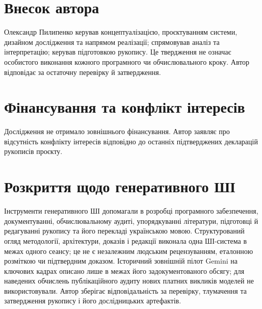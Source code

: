 \section*{Внесок автора}
Олександр Пилипенко керував концептуалізацією, проєктуванням системи, дизайном дослідження та напрямом реалізації; спрямовував аналіз та інтерпретацію; керував підготовкою рукопису. Це твердження не означає особистого виконання кожного програмного чи обчислювального кроку. Автор відповідає за остаточну перевірку й затвердження.

\section*{Фінансування та конфлікт інтересів}
Дослідження не отримало зовнішнього фінансування. Автор заявляє про відсутність конфлікту інтересів відповідно до останніх підтверджених декларацій рукописів проєкту.

\section*{Розкриття щодо генеративного ШІ}
Інструменти генеративного ШІ допомагали в розробці програмного забезпечення, документуванні, обчислювальному аудиті, упорядкуванні літератури, підготовці й редагуванні рукопису та його перекладі українською мовою. Структурований огляд методології, архітектури, доказів і редакції виконала одна ШІ-система в межах одного сеансу; це не є незалежним людським рецензуванням, еталонною розміткою чи підтвердним доказом. Історичний зовнішній пілот Gemini на ключових кадрах описано лише в межах його задокументованого обсягу; для наведених обчислень публікаційного аудиту нових платних викликів моделей не використовували. Автор зберігає відповідальність за перевірку, тлумачення та затвердження рукопису і його дослідницьких артефактів.
